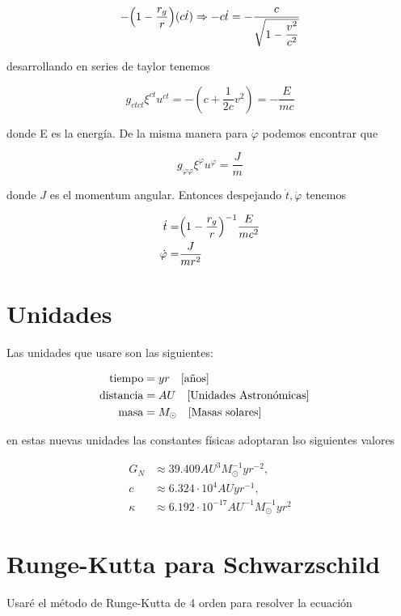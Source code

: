 \documentclass[../Main.tex]{subfiles}
\begin{document}
\begin{eqnarray*}
    -\qty(1-\dfrac{r_{g}}{r})(c\dot{t}) \Rightarrow -c\dot{t} = -\dfrac{c}{\sqrt{1-\dfrac{v^{2}}{c^{2}}}}
\end{eqnarray*}

desarrollando en series de taylor tenemos 

\begin{equation*}
    g_{ct ct}\xi^{ct}u^{ct} = -(c+\frac{1}{2c}v^{2}) = -\dfrac{E}{mc}
\end{equation*}

donde E es la energía. De la misma manera para $\dot{\varphi}$ podemos encontrar que

\begin{equation*}
    g_{\varphi \varphi}\xi^{\varphi}u^{\varphi} = \dfrac{J}{m}
\end{equation*}

donde $J$ es el momentum angular. Entonces despejando $\dot{t}, \dot{\varphi}$ tenemos

\begin{eqnarray}
    \dot{t} = & \qty(1-\dfrac{r_{g}}{r})^{-1}\dfrac{E}{mc^{2}} \\
    \dot{\varphi} = & \dfrac{J}{mr^{2}}
\end{eqnarray}

\section{Unidades}
Las unidades que usare son las siguientes:

\begin{align}
    \text{tiempo} & = yr\qq{[años]} \\
    \text{distancia} & = AU\qq{[Unidades Astronómicas]} \\
    \text{masa} & = M_{\odot}\qq{[Masas solares]}
\end{align}

en estas nuevas unidades las constantes físicas adoptaran lso siguientes valores

\begin{align}
    G_{N} & \approx 39.409 AU^{3}M_{\odot}^{-1}yr^{-2}, \\
    c & \approx 6.324 \cdot 10^{4} AU yr^{-1}, \\
    \kappa & \approx 6.192 \cdot 10^{-17} AU^{-1}M_{\odot}^{-1}yr^{2}
\end{align}

\section{Runge-Kutta para Schwarzschild}\label{rungeKutta}
Usaré el método de Runge-Kutta de 4 orden para resolver la ecuación
\end{document}
